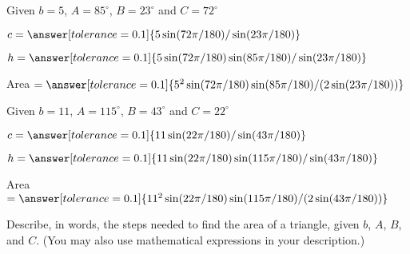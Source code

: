 \documentclass[number]{ximera}
\begin{document}
\begin{problem}
Given $b = 5$, $A = 85^\circ$, $B = 23^\circ$ and $C = 72^\circ$

$c=\answer[tolerance=0.1]{5\sin(72\pi/180)/\sin(23\pi/180)}$

$h=\answer[tolerance=0.1]{5\sin(72\pi/180)\sin(85\pi/180)/\sin(23\pi/180)}$

Area $=\answer[tolerance=0.1]{5^2\sin(72\pi/180)\sin(85\pi/180)/(2\sin(23\pi/180))}$
\end{problem}

\begin{problem}
Given $b = 11$, $A = 115^\circ$, $B = 43^\circ$ and $C = 22^\circ$

$c=\answer[tolerance=0.1]{11\sin(22\pi/180)/\sin(43\pi/180)}$

$h=\answer[tolerance=0.1]{11\sin(22\pi/180)\sin(115\pi/180)/\sin(43\pi/180)}$

Area $=\answer[tolerance=0.1]{11^2\sin(22\pi/180)\sin(115\pi/180)/(2\sin(43\pi/180))}$
\end{problem}

\begin{question} 
Describe, in words, the steps needed to find the area of a triangle, given $b$, $A$, $B$, and $C$. (You may also use mathematical expressions in your description.)
\end{question}
\begin{freeResponse}
\end{freeResponse}
\end{document}
